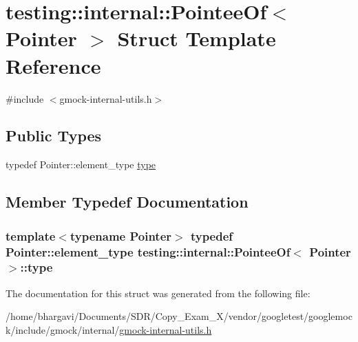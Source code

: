 \hypertarget{structtesting_1_1internal_1_1_pointee_of}{}\section{testing\+:\+:internal\+:\+:Pointee\+Of$<$ Pointer $>$ Struct Template Reference}
\label{structtesting_1_1internal_1_1_pointee_of}


{\ttfamily \#include $<$gmock-\/internal-\/utils.\+h$>$}

\subsection*{Public Types}
\begin{DoxyCompactItemize}
\item 
typedef Pointer\+::element\+\_\+type \hyperlink{structtesting_1_1internal_1_1_pointee_of_aca4d92c8f978e47a8695e82cffc11837}{type}
\end{DoxyCompactItemize}


\subsection{Member Typedef Documentation}
\subsubsection[{\texorpdfstring{type}{type}}]{\setlength{\rightskip}{0pt plus 5cm}template$<$typename Pointer$>$ typedef Pointer\+::element\+\_\+type {\bf testing\+::internal\+::\+Pointee\+Of}$<$ Pointer $>$\+::{\bf type}}\hypertarget{structtesting_1_1internal_1_1_pointee_of_aca4d92c8f978e47a8695e82cffc11837}{}\label{structtesting_1_1internal_1_1_pointee_of_aca4d92c8f978e47a8695e82cffc11837}


The documentation for this struct was generated from the following file\+:\begin{DoxyCompactItemize}
\item 
/home/bhargavi/\+Documents/\+S\+D\+R/\+Copy\+\_\+\+Exam\+\_\+X/vendor/googletest/googlemock/include/gmock/internal/\hyperlink{gmock-internal-utils_8h}{gmock-\/internal-\/utils.\+h}\end{DoxyCompactItemize}
